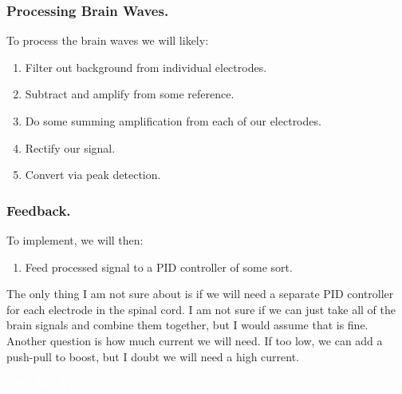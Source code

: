 \subsubsection{Processing Brain Waves.}
To process the brain waves we will likely:

\begin{enumerate}
    \item Filter out background from individual electrodes. 
    \item Subtract and amplify from some reference.
    \item Do some summing amplification from each of our electrodes.
    \item Rectify our signal.
    \item Convert via peak detection.
\end{enumerate}

\subsubsection{Feedback.}
To implement, we will then: 

\begin{enumerate}
    \item Feed processed signal to a PID controller of some sort.
\end{enumerate}

The only thing I am not sure about is if we will need a separate PID controller for each electrode in the spinal cord. I am not sure if we can just take all of the brain signals and combine them together, but I would assume that is fine. Another question is how much current we will need. If too low, we can add a push-pull to boost, but I doubt we will need a high current. 













\vfill\pagebreak



\pagecolor{black}\afterpage{\nopagecolor}


       \vspace*{1in}
       
\begin{adjustbox}{minipage=10cm,scale={2}{3}}

       \textbf{\fontsize{30}{30}\selectfont \textcolor{white}{THANK YOU.}}\newline
\\

\end{adjustbox}


